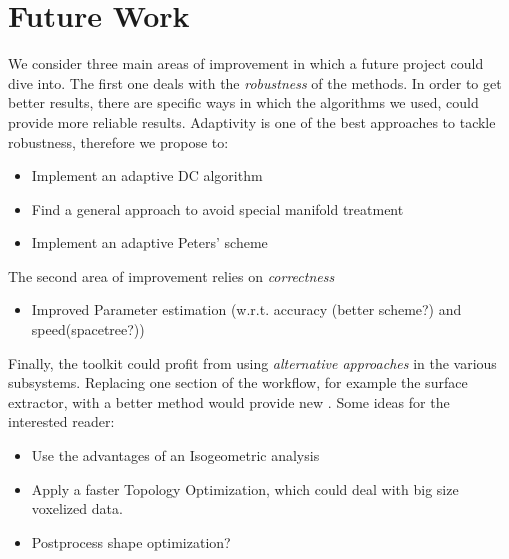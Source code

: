 \section{Future Work}
\label{sec:Future}
We consider three main areas of improvement in which a future project could dive into. The first one deals with the \textit{robustness} of the methods.  In order to get better results, there are specific ways in which the algorithms we used, could provide more reliable results. Adaptivity is one of the best approaches to tackle robustness, therefore we propose to:  
\begin{itemize}
\item Implement an adaptive DC algorithm
\item Find a general approach to  avoid special manifold treatment
\item Implement an adaptive Peters' scheme
\end{itemize}
The second area of improvement relies on \textit{correctness}
\begin{itemize}
\item Improved Parameter estimation (w.r.t. accuracy (better scheme?) and speed(spacetree?))
\end{itemize}
Finally, the toolkit could profit from using \textit{alternative approaches} in the various subsystems. Replacing one section of the workflow, for example the surface extractor, with a better method would provide new . Some ideas for the interested reader:
\begin{itemize}
\item Use the advantages of an Isogeometric analysis

\item Apply a faster Topology Optimization, which could deal with big size voxelized data.

\item Postprocess shape optimization?
\end{itemize}
